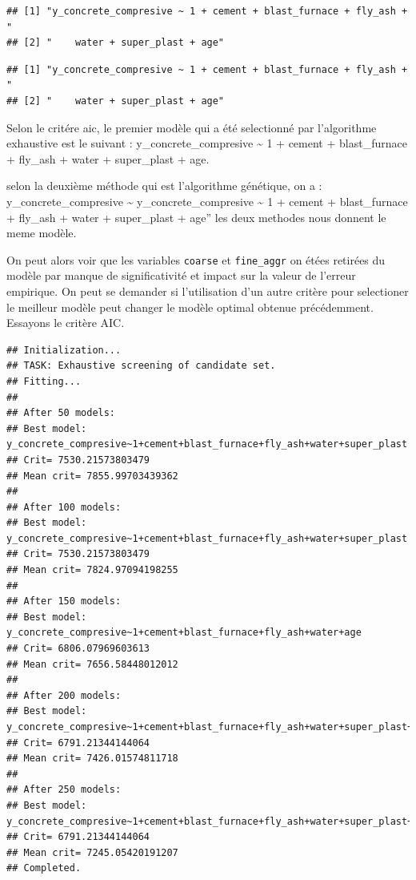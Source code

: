 \documentclass[
  12pt,
]{article}
\begin{document}
\begin{verbatim}
## [1] "y_concrete_compresive ~ 1 + cement + blast_furnace + fly_ash + "
## [2] "    water + super_plast + age"
\end{verbatim}

\begin{verbatim}
## [1] "y_concrete_compresive ~ 1 + cement + blast_furnace + fly_ash + "
## [2] "    water + super_plast + age"
\end{verbatim}

Selon le critére aic, le premier modèle qui a été selectionné par
l'algorithme exhaustive est le suivant : y\_concrete\_compresive
\textasciitilde{} 1 + cement + blast\_furnace + fly\_ash + water +
super\_plast + age.

selon la deuxième méthode qui est l'algorithme génétique, on a :
y\_concrete\_compresive \textasciitilde{} y\_concrete\_compresive
\textasciitilde{} 1 + cement + blast\_furnace + fly\_ash + water +
super\_plast + age'' les deux methodes nous donnent le meme modèle.

On peut alors voir que les variables \texttt{coarse} et
\texttt{fine\_aggr} on étées retirées du modèle par manque de
significativité et impact sur la valeur de l'erreur empirique. On peut
se demander si l'utilisation d'un autre critère pour selectioner le
meilleur modèle peut changer le modèle optimal obtenue précédemment.
Essayons le critère AIC.

\begin{verbatim}
## Initialization...
## TASK: Exhaustive screening of candidate set.
## Fitting...
## 
## After 50 models:
## Best model: y_concrete_compresive~1+cement+blast_furnace+fly_ash+water+super_plast
## Crit= 7530.21573803479
## Mean crit= 7855.99703439362
## 
## After 100 models:
## Best model: y_concrete_compresive~1+cement+blast_furnace+fly_ash+water+super_plast
## Crit= 7530.21573803479
## Mean crit= 7824.97094198255
## 
## After 150 models:
## Best model: y_concrete_compresive~1+cement+blast_furnace+fly_ash+water+age
## Crit= 6806.07969603613
## Mean crit= 7656.58448012012
## 
## After 200 models:
## Best model: y_concrete_compresive~1+cement+blast_furnace+fly_ash+water+super_plast+age
## Crit= 6791.21344144064
## Mean crit= 7426.01574811718
## 
## After 250 models:
## Best model: y_concrete_compresive~1+cement+blast_furnace+fly_ash+water+super_plast+age
## Crit= 6791.21344144064
## Mean crit= 7245.05420191207
## Completed.
\end{verbatim}
\end{document}
